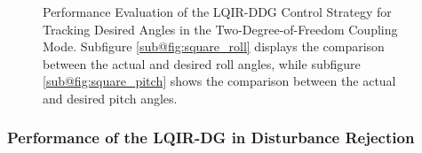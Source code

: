 \documentclass[3p,times]{elsarticle}
\begin{document}


\begin{figure}[H]
	\centering
	\caption{Performance Evaluation of the LQIR-DDG Control Strategy for Tracking Desired Angles in the Two-Degree-of-Freedom Coupling Mode. Subfigure \ref{sub@fig:square_roll} displays the comparison between the actual and desired roll angles, while subfigure \ref{sub@fig:square_pitch} shows the comparison between the actual and desired pitch angles.}
	\label{fig:square}
\end{figure}

\subsubsection{Performance of the LQIR-DG in Disturbance Rejection}\label{sec:disturbance}
\end{document}
